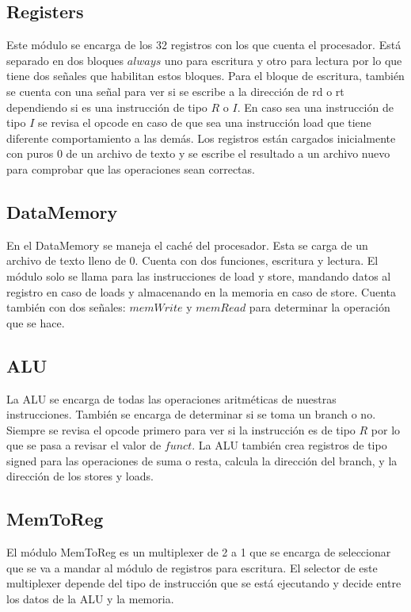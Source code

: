 \documentclass[12pt,a4paper]{article}
\begin{document}
\subsection{Registers}
\text Este módulo se encarga de los 32 registros con los que cuenta el procesador. Está separado en dos bloques $always$ uno para escritura y otro para lectura por lo que tiene dos señales que habilitan estos bloques. Para el bloque de escritura, también se cuenta con una señal para ver si se escribe a la dirección de rd o rt dependiendo si es una instrucción de tipo $R$ o $I$. En caso sea una instrucción de tipo $I$ se revisa el opcode en caso de que sea una instrucción load que tiene diferente comportamiento a las demás. Los registros están cargados inicialmente con puros $0$ de un archivo de texto y se escribe el resultado a un archivo nuevo para comprobar que las operaciones sean correctas.

\subsection{DataMemory}
\text En el DataMemory se maneja el caché del procesador. Esta se carga de un archivo de texto lleno de 0. Cuenta con dos funciones, escritura y lectura. El módulo solo se llama para las instrucciones de load y store, mandando datos al registro en caso de loads y almacenando en la memoria en caso de store. Cuenta también con dos señales: $memWrite$ y $memRead$ para determinar la operación que se hace.

\subsection{ALU}
\text La ALU se encarga de todas las operaciones aritméticas de nuestras instrucciones. También se encarga de determinar si se toma un branch o no. Siempre se revisa el opcode primero para ver si la instrucción es de tipo $R$ por lo que se pasa a revisar el valor de $funct$. La ALU también crea registros de tipo signed para las operaciones de suma o resta, calcula la dirección del branch, y la dirección de los stores y loads.

\subsection{MemToReg}
\text El módulo MemToReg es un multiplexer de 2 a 1 que se encarga de seleccionar que se va a mandar al módulo de registros para escritura. El selector de este multiplexer depende del tipo de instrucción que se está ejecutando y decide entre los datos de la ALU y la memoria.
\end{document}
